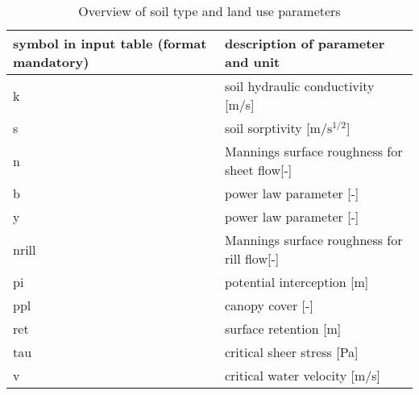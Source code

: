 \begin{table}[!t]
  \centering
    \caption{Overview of soil type and land use parameters}
    \begin{tabular}{p{3.8cm}l}
    \hline  \hline
        symbol in input table (format mandatory) & description of parameter and unit \\
    \hline
        k&  soil hydraulic conductivity [m/s]\\
        s&  soil sorptivity [$\mathrm{m/s^{1/2}}$]\\
        n&   Mannings surface roughness for sheet flow[-] \\
        b&   power law parameter [-] \\
        y&   power law parameter [-] \\
        nrill&  Mannings surface roughness for rill flow[-] \\
        pi&   potential interception [m]\\
        ppl& canopy cover [-] \\
        ret& surface retention [m] \\
        tau& critical sheer stress [Pa] \\
        v &  critical water velocity [m/s] \\
    \hline  \hline
    \end{tabular}%
  \label{tab:soilveg}%
\end{table}%
